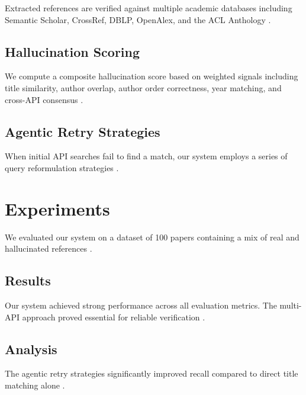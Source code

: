 \documentclass[11pt]{article}
\begin{document}
Extracted references are verified against multiple academic databases including Semantic Scholar, CrossRef, DBLP, OpenAlex, and the ACL Anthology \cite{brown-etal-2020-language,liu2019roberta}.

\lipsum[21-23]

\subsection{Hallucination Scoring}

We compute a composite hallucination score based on weighted signals including title similarity, author overlap, author order correctness, year matching, and cross-API consensus \cite{raffel-etal-2020-exploring}.

\lipsum[24-26]

\subsection{Agentic Retry Strategies}

When initial API searches fail to find a match, our system employs a series of query reformulation strategies \cite{lewis-etal-2020-bart,mikolov-etal-2013-distributed}.

\lipsum[42-44]

\section{Experiments}

We evaluated our system on a dataset of 100 papers containing a mix of real and hallucinated references \cite{wolf-etal-2020-transformers,lewis-etal-2020-bart}.

\lipsum[26-28]

\subsection{Results}

Our system achieved strong performance across all evaluation metrics. The multi-API approach proved essential for reliable verification \cite{mikolov-etal-2013-distributed,pennington-etal-2014-glove}.

\lipsum[29-31]

\subsection{Analysis}

The agentic retry strategies significantly improved recall compared to direct title matching alone \cite{peters-etal-2018-deep}.
\end{document}
